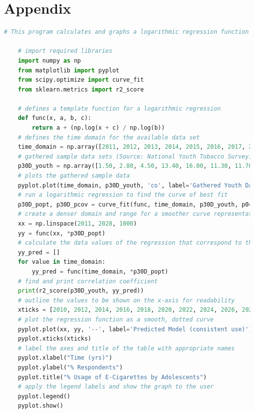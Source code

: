 \pagebreak

\section*{Appendix}

\begin{lstlisting}[language=python,breaklines=true]
    # This program calculates and graphs a logarithmic regression function for a vector that includes data relating to the consumption of nicotine via e-cigarettes for adolescents

    # import required libraries
    import numpy as np
    from matplotlib import pyplot
    from scipy.optimize import curve_fit
    from sklearn.metrics import r2_score
    
    # defines a template function for a logarithmic regression
    def func(x, a, b, c):
        return a + (np.log(x + c) / np.log(b))
    # defines the time domain for the available data set
    time_domain = np.array([2011, 2012, 2013, 2014, 2015, 2016, 2017, 2018])
    # gathered sample data sets (Source: National Youth Tobacco Survey)
    p30D_youth = np.array([1.50, 2.80, 4.50, 13.40, 16.00, 11.30, 11.70, 20.8])
    # plots the gathered sample data
    pyplot.plot(time_domain, p30D_youth, 'co', label='Gathered Youth Data (consistent use)')
    # run a logarithmic regression to find the curve of best fit
    p30D_popt, p30D_pcov = curve_fit(func, time_domain, p30D_youth, p0=(-30, 1.1, 5))
    # create a denser domain and range for a smoother curve representation
    xx = np.linspace(2011, 2028, 1000)
    yy = func(xx, *p30D_popt)
    # calculate the data values of the regression that correspond to the sample data
    yy_pred = []
    for value in time_domain:
        yy_pred = func(time_domain, *p30D_popt)
    # find and print correlation coefficient
    print(r2_score(p30D_youth, yy_pred))
    # outline the values to be shown on the x-axis for readability
    xticks = [2010, 2012, 2014, 2016, 2018, 2020, 2022, 2024, 2026, 2028]
    # plot the regression function as a smooth, dotted curve
    pyplot.plot(xx, yy, '--', label='Predicted Model (consistent use)')
    pyplot.xticks(xticks)
    # label the axes and title of the table with appropriate names
    pyplot.xlabel("Time (yrs)")
    pyplot.ylabel("% Respondents")
    pyplot.title("% Usage of E-Cigarettes by Adolescents")
    # apply the legend labels and show the graph to the user
    pyplot.legend()
    pyplot.show()    
\end{lstlisting}

\setcounter{section}{0}